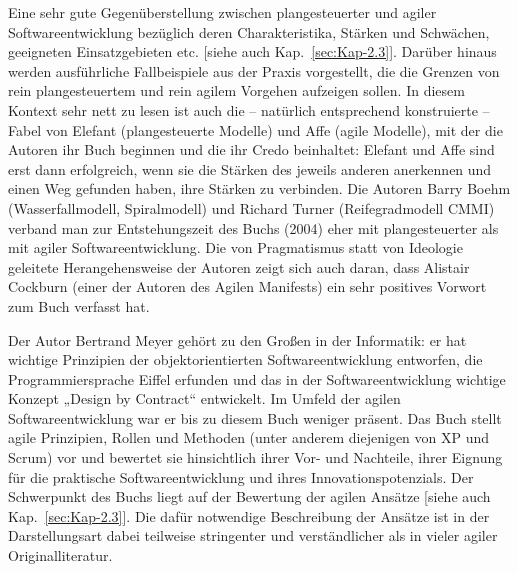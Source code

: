 {Eine sehr gute Gegenüberstellung zwischen plangesteuerter und agiler Softwareentwicklung bezüglich deren Charakteristika, Stärken und Schwächen, geeigneten Einsatzgebieten etc. [siehe auch Kap.~\ref{sec:Kap-2.3}]. Darüber hinaus werden ausführliche Fallbeispiele aus der Praxis vorgestellt, die die Grenzen von rein plangesteuertem und rein agilem Vorgehen aufzeigen sollen. In diesem Kontext sehr nett zu lesen ist auch die – natürlich entsprechend konstruierte – Fabel von Elefant (plangesteuerte Modelle) und Affe (agile Modelle), mit der die Autoren ihr Buch beginnen und die ihr Credo beinhaltet: Elefant und Affe sind erst dann erfolgreich, wenn sie die Stärken des jeweils anderen anerkennen und einen Weg gefunden haben, ihre Stärken zu verbinden. Die Autoren Barry Boehm (Wasserfallmodell, Spiralmodell) und Richard Turner (Reifegradmodell CMMI) verband man zur Entstehungszeit des Buchs (2004) eher mit plangesteuerter als mit agiler Softwareentwicklung. Die von Pragmatismus statt von Ideologie geleitete Herangehensweise der Autoren zeigt sich auch daran, dass Alistair Cockburn (einer der Autoren des Agilen Manifests) ein sehr positives Vorwort zum Buch verfasst hat.}

{Der Autor Bertrand Meyer gehört zu den Großen in der Informatik: er hat wichtige Prinzipien der objektorientierten Softwareentwicklung entworfen, die Programmiersprache Eiffel erfunden und das in der Softwareentwicklung wichtige Konzept „Design by Contract“ entwickelt. Im Umfeld der agilen Softwareentwicklung war er bis zu diesem Buch weniger präsent. Das Buch stellt agile Prinzipien, Rollen und Methoden (unter anderem diejenigen von XP und Scrum) vor und bewertet sie hinsichtlich ihrer Vor- und Nachteile, ihrer Eignung für die praktische Softwareentwicklung und ihres Innovationspotenzials. Der Schwerpunkt des Buchs liegt auf der Bewertung der agilen Ansätze [siehe auch Kap.~\ref{sec:Kap-2.3}]. Die dafür notwendige Beschreibung der Ansätze ist in der Darstellungsart dabei teilweise stringenter und verständlicher als in vieler agiler Originalliteratur.}